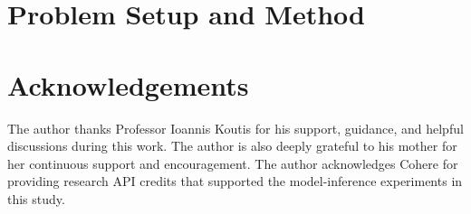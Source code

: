 \documentclass[pdflatex,sn-mathphys-num]{sn-jnl}
\begin{document}


\section{Problem Setup and Method}
\label{sec:problem_setup_method}


























\section*{Acknowledgements}
The author thanks Professor Ioannis Koutis for his support, guidance, and helpful
discussions during this work. The author is also deeply grateful to his mother for
her continuous support and encouragement. The author acknowledges Cohere for
providing research API credits that supported the model-inference experiments in
this study.



\clearpage
\onecolumn

\end{document}
